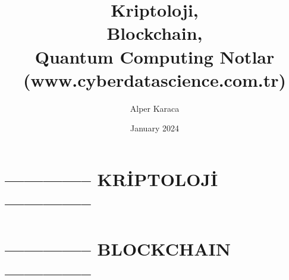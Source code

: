 \documentclass{article}
\title{Kriptoloji, \\Blockchain, \\Quantum Computing Notlar (www.cyberdatascience.com.tr)}
\author{Alper Karaca}
\date{January 2024}
\begin{document}
\maketitle

\newpage
\tableofcontents
\newpage

\section{-------------- KRİPTOLOJİ --------------}












\section{-------------- BLOCKCHAIN --------------}










\end{document}
